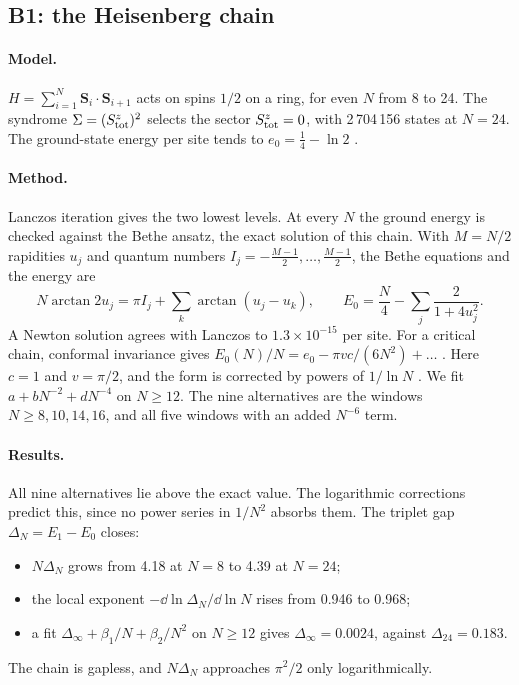 \subsection{B1: the Heisenberg chain}\label{app:hosted:b1}

\paragraph{Model.} $H=\sum_{i=1}^{N}\mathbf S_i\cdot\mathbf S_{i+1}$ acts on spins $1/2$ on a ring, for even $N$ from 8 to 24. The
syndrome $\Sigma=(S^z_{\rm tot})^2$ selects the sector $S^z_{\rm tot}=0$, with 2\,704\,156 states at $N=24$. The ground-state energy per
site tends to $e_0=\tfrac14-\ln2$ \cite{bethe1931,hulthen1938}.

\paragraph{Method.} Lanczos iteration gives the two lowest levels. At every $N$ the ground energy is checked against the Bethe ansatz, the
exact solution of this chain. With $M=N/2$ rapidities $u_j$ and quantum numbers $I_j=-\tfrac{M-1}2,\dots,\tfrac{M-1}2$, the Bethe equations
and the energy are
\[
N\arctan2u_j=\pi I_j+\sum_k\arctan(u_j-u_k),\qquad E_0=\frac N4-\sum_j\frac2{1+4u_j^2}.
\]
A Newton solution agrees with Lanczos to $1.3\times10^{-15}$ per site. For a critical chain, conformal invariance gives
$E_0(N)/N=e_0-\pi vc/(6N^2)+\dots$ \cite{blote1986}. Here $c=1$ and $v=\pi/2$, and the form is corrected by powers of $1/\ln N$
\cite{affleck1989}. We fit $a+bN^{-2}+dN^{-4}$ on $N\ge12$. The nine alternatives are the windows $N\ge8,10,14,16$, and all five windows
with an added $N^{-6}$ term.

\paragraph{Results.} All nine alternatives lie above the exact value. The logarithmic corrections predict this, since no power series in
$1/N^2$ absorbs them. The triplet gap $\Delta_N=E_1-E_0$ closes:
\begin{itemize}[nosep]
\item $N\Delta_N$ grows from 4.18 at $N=8$ to 4.39 at $N=24$;
\item the local exponent $-\dd\ln\Delta_N/\dd\ln N$ rises from 0.946 to 0.968;
\item a fit $\Delta_\infty+\beta_1/N+\beta_2/N^2$ on $N\ge12$ gives $\Delta_\infty=0.0024$, against $\Delta_{24}=0.183$.
\end{itemize}
The chain is gapless, and $N\Delta_N$ approaches $\pi^2/2$ only logarithmically.

